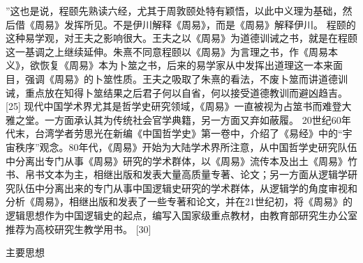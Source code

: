\documentclass[12pt,UTF8]{ctexbook}
\begin{document}
”这也是说，程颐先熟读六经，尤其于周敦颐处特有颖悟，以此中义理为基础，然后借《周易》发挥所见。不是伊川解释《周易》，而是《周易》解释伊川。
程颐的这种易学观，对王夫之影响很大。王夫之以《周易》为道德训诫之书，就是在程颐这一基调之上继续延伸。朱熹不同意程颐以《周易》为言理之书，作《周易本义》，欲恢复《周易》本为卜筮之书，后来的易学家从中发挥出道理这一本来面目，强调《周易》的卜筮性质。王夫之吸取了朱熹的看法，不废卜筮而讲道德训诫，重点放在知得卜筮结果之后君子何以自省，何以接受道德教训而避凶趋吉。 [25]
现代中国学术界尤其是哲学史研究领域，《周易》一直被视为占筮书而难登大雅之堂。一方面承认其为传统社会官学典籍，另一方面又弃如蔽履。
20世纪60年代末，台湾学者劳思光在新编《中国哲学史》第一卷中，介绍了《易经》中的“宇宙秩序”观念。80年代，《周易》开始为大陆学术界所注意，从中国哲学史研究队伍中分离出专门从事《周易》研究的学术群体，以《周易》流传本及出土《周易》竹书、帛书文本为主，相继出版和发表大量高质量专著、论文；另一方面从逻辑学研究队伍中分离出来的专门从事中国逻辑史研究的学术群体，从逻辑学的角度审视和分析《周易》，相继出版和发表了一些专著和论文，并在21世纪初，将《周易》的逻辑思想作为中国逻辑史的起点，编写入国家级重点教材，由教育部研究生办公室推荐为高校研究生教学用书。 [30]

主要思想
\end{document}
